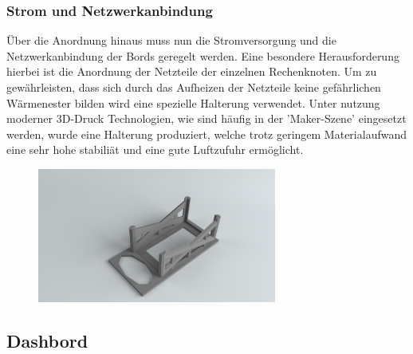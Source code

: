 \subsubsection{Strom und Netzwerkanbindung}
Über die Anordnung hinaus muss nun die Stromversorgung und die Netzwerkanbindung
der Bords geregelt werden. Eine besondere Herausforderung hierbei ist die 
Anordnung der Netzteile der einzelnen Rechenknoten. 
Um zu gewährleisten, dass sich durch das Aufheizen der Netzteile keine gefährlichen
Wärmenester bilden wird eine spezielle Halterung verwendet.
Unter nutzung moderner 3D-Druck Technologien, wie sind häufig in der 'Maker-Szene' eingesetzt werden,
wurde eine Halterung produziert, welche trotz geringem Materialaufwand eine sehr hohe stabiliät 
und eine gute Luftzufuhr ermöglicht.
\begin{center}
	\begin{figure}
		\centering
		\includegraphics[width=0.7\textwidth]{./Bilder/Server-Aufbau/RenderPowerSupplyBox30.png}
		\label{fig:sample_figure}
	\end{figure}
\end{center}


\subsection{Dashbord}
